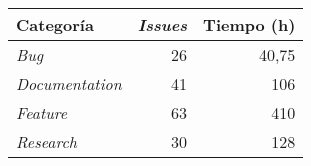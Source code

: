 \begin{longtable}[]{@{}lrr@{}}
\toprule
\begin{minipage}[b]{0.37\columnwidth}\raggedright\strut
Categoría\strut
\end{minipage} & \begin{minipage}[b]{0.19\columnwidth}\raggedright\strut
\emph{Issues}\strut
\end{minipage} & \begin{minipage}[b]{0.19\columnwidth}\raggedright\strut
Tiempo (h)\strut
\end{minipage}\tabularnewline
\midrule
\endhead
\begin{minipage}[t]{0.37\columnwidth}\raggedright\strut
\emph{Bug}\strut
\end{minipage} & \begin{minipage}[t]{0.19\columnwidth}\raggedright\strut
26\strut
\end{minipage} & \begin{minipage}[t]{0.19\columnwidth}\raggedright\strut
40,75\strut
\end{minipage}\tabularnewline
\begin{minipage}[t]{0.37\columnwidth}\raggedright\strut
\emph{Documentation}\strut
\end{minipage} & \begin{minipage}[t]{0.19\columnwidth}\raggedright\strut
41\strut
\end{minipage} & \begin{minipage}[t]{0.19\columnwidth}\raggedright\strut
106\strut
\end{minipage}\tabularnewline
\begin{minipage}[t]{0.37\columnwidth}\raggedright\strut
\emph{Feature}\strut
\end{minipage} & \begin{minipage}[t]{0.19\columnwidth}\raggedright\strut
63\strut
\end{minipage} & \begin{minipage}[t]{0.19\columnwidth}\raggedright\strut
410\strut
\end{minipage}\tabularnewline
\begin{minipage}[t]{0.37\columnwidth}\raggedright\strut
\emph{Research}\strut
\end{minipage} & \begin{minipage}[t]{0.19\columnwidth}\raggedright\strut
30\strut
\end{minipage} & \begin{minipage}[t]{0.19\columnwidth}\raggedright\strut
128\strut

\end{minipage}
\end{longtable}
